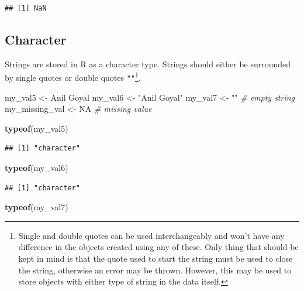 \documentclass[
]{book}
\newenvironment{Shaded}{\begin{snugshade}}{\end{snugshade}}
\newcommand{\CommentTok}[1]{\textcolor[rgb]{0.56,0.35,0.01}{\textit{#1}}}
\newcommand{\ConstantTok}[1]{\textcolor[rgb]{0.56,0.35,0.01}{#1}}
\newcommand{\FunctionTok}[1]{\textcolor[rgb]{0.13,0.29,0.53}{\textbf{#1}}}
\newcommand{\NormalTok}[1]{#1}
\newcommand{\OtherTok}[1]{\textcolor[rgb]{0.56,0.35,0.01}{#1}}
\newcommand{\StringTok}[1]{\textcolor[rgb]{0.31,0.60,0.02}{#1}}
\begin{document}
\begin{verbatim}
## [1] NaN
\end{verbatim}

\hypertarget{string}{%
\subsection{Character}\label{string}}

Strings are stored in R as a character type. Strings should either be surrounded by single quotes \texttt{\textquotesingle{}\textquotesingle{}} or double quotes \texttt{""}\footnote{Single and double quotes can be used interchangeably and won't have any difference in the objects created using any of these. Only thing that should be kept in mind is that the quote used to start the string must be used to close the string, otherwise an error may be thrown. However, this may be used to store objects with either type of string in the data itself.}.

\begin{Shaded}
\begin{Highlighting}[]
\NormalTok{my\_val5 }\OtherTok{\textless{}{-}} \StringTok{\textquotesingle{}Anil Goyal\textquotesingle{}}
\NormalTok{my\_val6 }\OtherTok{\textless{}{-}} \StringTok{"Anil Goyal"}
\NormalTok{my\_val7 }\OtherTok{\textless{}{-}} \StringTok{""} \CommentTok{\# empty string}
\NormalTok{my\_missing\_val }\OtherTok{\textless{}{-}} \ConstantTok{NA} \CommentTok{\# missing value}

\FunctionTok{typeof}\NormalTok{(my\_val5)}
\end{Highlighting}
\end{Shaded}

\begin{verbatim}
## [1] "character"
\end{verbatim}

\begin{Shaded}
\begin{Highlighting}[]
\FunctionTok{typeof}\NormalTok{(my\_val6)}
\end{Highlighting}
\end{Shaded}

\begin{verbatim}
## [1] "character"
\end{verbatim}

\begin{Shaded}
\begin{Highlighting}[]
\FunctionTok{typeof}\NormalTok{(my\_val7)}
\end{Highlighting}
\end{Shaded}
\end{document}
